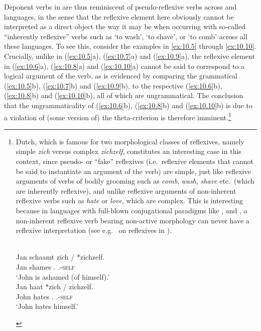 \documentclass[output=paper]{langsci/langscibook}
\begin{document}
Deponent verbs in  are thus reminiscent of pseudo-reflexive verbs
across  and  languages, in the sense that the reflexive element
here obviously cannot be interpreted as a direct object the way it may be when
occurring with so-called “inherently reflexive” verbs such as ‘to wash’, ‘to
shave’, or ‘to comb’ across all these languages. To see this, consider the
examples in \eqref{ex:10.5} through \eqref{ex:10.10}. Crucially, unlike in
(\ref{ex:10.5}a), (\ref{ex:10.7}a) and (\ref{ex:10.9}a), the reflexive element in
(\ref{ex:10.6}a), (\ref{ex:10.8}a) and (\ref{ex:10.10}a) cannot be said to
correspond to a logical argument of the verb, as is evidenced by comparing the
grammatical (\ref{ex:10.5}b), (\ref{ex:10.7}b) and (\ref{ex:10.9}b), to the
respective (\ref{ex:10.6}b), (\ref{ex:10.8}b) and (\ref{ex:10.10}b), all of which
are ungrammatical. The conclusion that the ungrammaticality of (\ref{ex:10.6}b),
(\ref{ex:10.8}b) and (\ref{ex:10.10}b) is due to a violation of (some version of)
the theta-criterion is therefore imminent.\footnote{Dutch, which is famous for
two morphological classes of reflexives, namely simple \emph{zich} versus
complex \emph{zichzelf}, constitutes an interesting case in this context, since
pseudo- or \enquote{fake} reflexives (i.e.\ reflexive elements that cannot be
said to instantiate an argument of the verb) are simple, just like reflexive
arguments of verbs of bodily grooming such as \emph{comb}, \emph{wash},
\emph{shave} etc.\ (which are inherently reflexive), and unlike reflexive
arguments of non-inherent reflexive verbs such as \emph{hate} or \emph{love},
which are complex. This is interesting because in languages with full-blown
conjugational paradigms like ,  and , a non-inherent
reflexive verb bearing non-active morphology can never have a reflexive
interpretation (see e.g.\ \citealt{Embick1997,Embick:2004b} on reflexives in
).

\begin{exe}
     \\
    \gll    Jan schaamt zich / *zichzelf.\\
            Jan shames \Refl.\Third{} {} \hphantom{*}\Refl.\Third-\textsc{self}\\
    \glt    \enquote*{John is ashamed (of himself).}
     \\
    \gll    Jan haat *zich / zichzelf.\\
            John hates \llap{*}\Refl.\Third{} {} \Refl.\Third{}-\textsc{self}\\
    \glt    \enquote*{John hates himself.}
\end{exe}}
\end{document}
